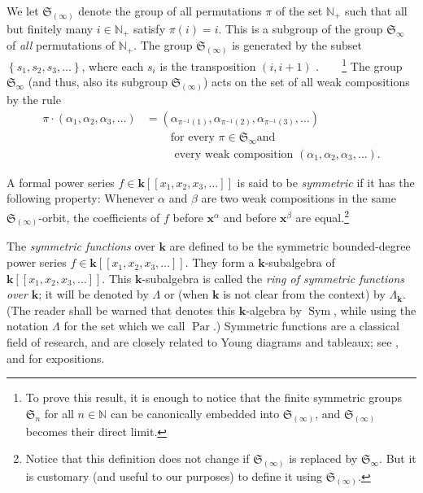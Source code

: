 \documentclass[numbers=enddot,12pt,final,onecolumn,notitlepage]{scrartcl}%
\theoremstyle{definition}
\begin{document}
We let $\mathfrak{S}_{\left(  \infty\right)  }$ denote the group of all
permutations $\pi$ of the set $\mathbb{N}_{+}$ such that all but finitely many
$i\in\mathbb{N}_{+}$ satisfy $\pi\left(  i\right)  =i$. This is a subgroup of
the group $\mathfrak{S}_{\infty}$ of \textit{all} permutations of
$\mathbb{N}_{+}$. The group $\mathfrak{S}_{\left(  \infty\right)  }$ is
generated by the subset $\left\{  s_{1},s_{2},s_{3},\ldots\right\}  $, where
each $s_{i}$ is the transposition $\left(  i,i+1\right)  $%
.\ \ \ \ \footnote{To prove this result, it is enough to notice that the
finite symmetric groups $\mathfrak{S}_{n}$ for all $n\in\mathbb{N}$ can be
canonically embedded into $\mathfrak{S}_{\left(  \infty\right)  }$, and
$\mathfrak{S}_{\left(  \infty\right)  }$ becomes their direct limit.} The
group $\mathfrak{S}_{\infty}$ (and thus, also its subgroup $\mathfrak{S}%
_{\left(  \infty\right)  }$) acts on the set of all weak compositions by the
rule%
\begin{align*}
\pi\cdot\left(  \alpha_{1},\alpha_{2},\alpha_{3},\ldots\right)   &  =\left(
\alpha_{\pi^{-1}\left(  1\right)  },\alpha_{\pi^{-1}\left(  2\right)  }%
,\alpha_{\pi^{-1}\left(  3\right)  },\ldots\right) \\
&  \ \ \ \ \ \ \ \ \ \ \text{for every }\pi\in\mathfrak{S}_{\infty}\text{
and}\\
&  \ \ \ \ \ \ \ \ \ \ \text{ every weak composition }\left(  \alpha
_{1},\alpha_{2},\alpha_{3},\ldots\right)  .
\end{align*}


A formal power series $f\in\mathbf{k}\left[  \left[  x_{1},x_{2},x_{3}%
,\ldots\right]  \right]  $ is said to be \textit{symmetric} if it has the
following property: Whenever $\alpha$ and $\beta$ are two weak compositions in
the same $\mathfrak{S}_{\left(  \infty\right)  }$-orbit, the coefficients of
$f$ before $\mathbf{x}^{\alpha}$ and before $\mathbf{x}^{\beta}$ are
equal.\footnote{Notice that this definition does not change if $\mathfrak{S}%
_{\left(  \infty\right)  }$ is replaced by $\mathfrak{S}_{\infty}$. But it is
customary (and useful to our purposes) to define it using $\mathfrak{S}%
_{\left(  \infty\right)  }$.}

The \textit{symmetric functions} over $\mathbf{k}$ are defined to be the
symmetric bounded-degree power series $f\in\mathbf{k}\left[  \left[
x_{1},x_{2},x_{3},\ldots\right]  \right]  $. They form a $\mathbf{k}%
$-subalgebra of $\mathbf{k}\left[  \left[  x_{1},x_{2},x_{3},\ldots\right]
\right]  $. This $\mathbf{k}$-subalgebra is called the \textit{ring of
symmetric functions over }$\mathbf{k}$; it will be denoted by $\Lambda$ or
(when $\mathbf{k}$ is not clear from the context) by $\Lambda_{\mathbf{k}}$.
(The reader shall be warned that \cite{LamPyl} denotes this $\mathbf{k}%
$-algebra by $\operatorname*{Sym}$, while using the notation $\Lambda$ for the
set which we call $\operatorname*{Par}$.) Symmetric functions are a classical
field of research, and are closely related to Young diagrams and tableaux; see
\cite[Chapter 7]{Stan99}, \cite{Macdon95} and \cite[Chapter 2]{GriRei15} for expositions.
\end{document}
